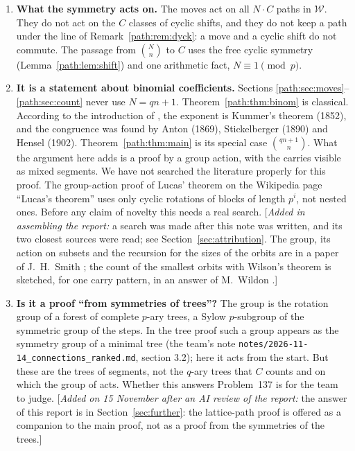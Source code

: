 \documentclass[11pt]{article}
\theoremstyle{definition}
\theoremstyle{remark}
\numberwithin{equation}{section}
\numberwithin{figure}{section}
\newcommand{\W}{\mathcal{W}}
\newcommand{\assembler}[1]{[\emph{Added in assembling the report:} #1]}
\newcommand{\revnote}[1]{[\emph{Added on 15 November after an AI review of the report:} #1]}
\begin{document}
\begin{enumerate}[leftmargin=*,itemsep=4pt]
\item \textbf{What the symmetry acts on.} The moves act on all $N\cdot C$ paths in $\W$. They do not act on the $C$
classes of cyclic shifts, and they do not keep a path under the line of Remark~\ref{path:rem:dyck}: a move and a cyclic
shift do not commute. The passage from $\binom Nn$ to $C$ uses the free cyclic symmetry (Lemma~\ref{path:lem:shift}) and
one arithmetic fact, $N\equiv1\pmod p$.

\item \textbf{It is a statement about binomial coefficients.} Sections \ref{path:sec:moves}--\ref{path:sec:count} never use
$N=qn+1$. Theorem~\ref{path:thm:binom} is classical. According to the introduction of \cite{Granville}, the exponent is Kummer's theorem
(1852), and the congruence was found by Anton (1869), Stickelberger (1890) and Hensel (1902). Theorem~\ref{path:thm:main} is
its special case $\binom{qn+1}n$. What the argument here adds is a proof by a group action, with the carries
visible as mixed segments. We have not searched the literature properly for this proof. The group-action proof of
Lucas' theorem on the Wikipedia page ``Lucas's theorem'' uses only cyclic rotations of blocks of length $p^i$, not nested ones.
Before any claim of novelty this needs a real search. \assembler{a search was made after this note was written, and its two closest sources were read; see
Section~\ref{sec:attribution}. The group, its action on subsets and the recursion for the sizes of the orbits
are in a paper of J.~H.~Smith \cite{Smith}; the count of the smallest orbits with Wilson's theorem is
sketched, for one carry pattern, in an answer of M.~Wildon \cite{Wildon}.}

\item \textbf{Is it a proof ``from symmetries of trees''?} The group is the rotation group of a forest of
complete $p$-ary trees, a Sylow $p$-subgroup of the symmetric group of the steps. In the tree proof such a group
appears as the symmetry group of a minimal tree (the team's note \texttt{notes/2026-11-14\_connections\_ranked.md},
section 3.2); here it acts from the start. But these are the trees of segments, not the $q$-ary trees that $C$ counts
and on which the group of \cite{Konvalinka} acts. Whether this answers Problem~137 is for the team to judge.
\revnote{the answer of this report is in Section~\ref{sec:further}: the lattice-path proof is offered as a
companion to the main proof, not as a proof from the symmetries of the trees.}


\end{enumerate}
\end{document}
